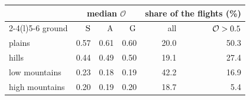 \begin{tabular}{@{}l r r r r r@{}}
\toprule
 & \multicolumn{3}{c}{median $\mathcal O$} & \multicolumn{2}{c}{share of the flights (\%)} \\
\cmidrule(lr){2-4}\cmidrule(l){5-6}
ground & $\mathrm{S}$ & $\mathrm{A}$ & $\mathrm{G}$ & all & $\mathcal O>0.5$ \\
\midrule
plains & 0.57 & 0.61 & 0.60 & 20.0 & 50.3 \\
hills & 0.44 & 0.49 & 0.50 & 19.1 & 27.4 \\
low mountains & 0.23 & 0.18 & 0.19 & 42.2 & 16.9 \\
high mountains & 0.20 & 0.19 & 0.20 & 18.7 & 5.4 \\
\bottomrule
\end{tabular}
